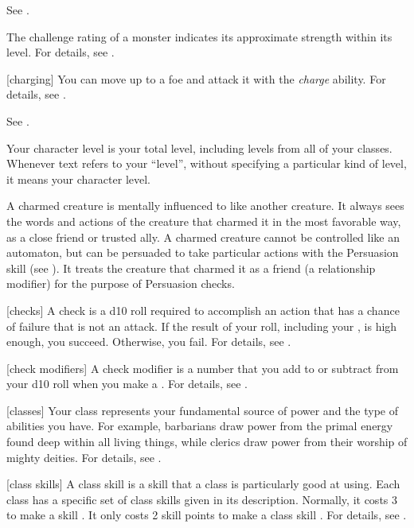  See .

 The challenge rating of a monster indicates its approximate strength within its level.
For details, see .

[charging] You can move up to a foe and attack it with the \textit{charge} ability.
For details, see .

 See .

 Your character level is your total level, including levels from all of your classes.
Whenever text refers to your ``level'', without specifying a particular kind of level, it means your character level.

 A charmed creature is mentally influenced to like another creature.
It always sees the words and actions of the creature that charmed it in the most favorable way, as a close friend or trusted ally.
A charmed creature cannot be controlled like an automaton, but can be persuaded to take particular actions with the Persuasion skill (see ).
It treats the creature that charmed it as a friend (a  relationship modifier) for the purpose of Persuasion checks.

[checks] A check is a d10 roll required to accomplish an action that has a chance of failure that is not an attack.
If the result of your roll, including your , is high enough, you succeed.
Otherwise, you fail.
For details, see .

[check modifiers] A check modifier is a number that you add to or subtract from your d10 roll when you make a .
For details, see .

[classes] Your class represents your fundamental source of power and the type of abilities you have.
For example, barbarians draw power from the primal energy found deep within all living things, while clerics draw power from their worship of mighty deities.
For details, see .

[class skills] A class skill is a skill that a class is particularly good at using.
Each class has a specific set of class skills given in its description.
Normally, it costs 3  to make a skill .
It only costs 2 skill points to make a class skill .
For details, see .

